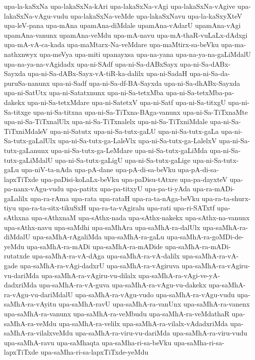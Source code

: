 {upa-la-kaSxNa
upa-lakaSxNa-kAri
upa-lakaSxNa-vAgi
upa-lakaSxNa-vAgive
upa-lakaSxNa-vAgu-vudu
upa-lakaSxNa-veMde
upa-lakaSxNavu
upa-la-kaSxyXteV
upa-leV-pana
upa-mAna
upamAna-diMdale
upamAna-vAdarU
upamAna-vAgi
upamAna-vanunx
upamAna-veMdu
upa-mA-navu
upa-mA-thaR-vuLaLx-dAdxgi
upa-mA-vA-ca-kada
upa-maMtarx-Na-veMdare
upa-maMtirx-sa-beVku
upa-ma-nathxnwyx
upa-meVya
upa-miti
upanayxsa
upa-na-yana
upa-na-ya-na-gaLiMdalU
upa-na-ya-na-vAgidadx
upa-ni-SAdf
upa-ni-Sa-dABxSayx
upa-ni-Sa-dABx-Sayxda
upa-ni-Sa-dABx-Sayx-vA-tiR-ka-dalilx
upa-ni-SadaH
upa-ni-Sa-da-puruSa-nanunx
upa-ni-Sadf
upa-ni-Sa-df-BA-Sayxda
upa-ni-Sa-dhABx-Sayxda
upa-ni-SatUtx
upa-ni-Satatxnunx
upa-ni-Sa-tetxMba
upa-ni-Sa-tetxMba-pa-dakekx
upa-ni-Sa-tetxMdare
upa-ni-SatetxV
upa-ni-Satf
upa-ni-Sa-titxgU
upa-ni-Sa-titxge
upa-ni-Sa-titxna
upa-ni-Sa-TiTxna-BAga-vanunx
upa-ni-Sa-TiTxnaMte
upa-ni-Sa-TiTxnalUlx
upa-ni-Sa-TiTxnalelx
upa-ni-Sa-TiTxniMdale
upa-ni-Sa-TiTxniMdaleV
upa-ni-Satutx
upa-ni-Sa-tutx-gaLU
upa-ni-Sa-tutx-gaLa
upa-ni-Sa-tutx-gaLalUlx
upa-ni-Sa-tutx-ga-LaleVlx
upa-ni-Sa-tutx-ga-LalelxV
upa-ni-Sa-tutx-gaLanunx
upa-ni-Sa-tutx-ga-LeMdare
upa-ni-Sa-tutx-gaLiMda
upa-ni-Sa-tutx-gaLiMdalU
upa-ni-Sa-tutx-gaLigU
upa-ni-Sa-tutx-gaLige
upa-ni-Sa-tutx-gaLu
upa-niV-ta-nAda
upa-pA-dane
upa-pA-di-sa-beVku
upa-pA-di-sa-lapxTiTxde
upa-paDisi-koLaLx-beVku
upa-paDisu-tAtxre
upa-pa-dayxteV
upa-pa-nanx-vAgu-vudu
upa-patitx
upa-pa-titxyU
upa-pa-ti-yAda
upa-ra-mADi-gaLalilx
upa-ra-rAma
upa-rata
upa-rataH
upa-ra-ta-nAga-beVku
upa-ra-ta-shurx-tiyu
upa-ra-ta-sitx-tikuSxH
upa-ra-ta-vAgiralu
upa-rati
upa-ri-SATxtf
upa-sAthxna
upa-sAthxnaM
upa-sAthx-nada
upa-sAthx-nakekx
upa-sAthx-na-vanunx
upa-sAthx-navu
upa-saMdhi
upa-saMhAra
upa-saMhA-ra-dalUlx
upa-saMhA-ra-diMdalU
upa-saMhA-rAgaliMda
upa-saMhA-ra-gaLu
upa-saMhA-ra-goMDi-de-yeMdu
upa-saMhA-ra-mADi
upa-saMhA-ra-mADide
upa-saMhA-ra-mADi-rutatxde
upa-saMhA-ra-vA-dAga
upa-saMhA-ra-vA-dalilx
upa-saMhA-ra-vA-gade
upa-saMhA-ra-vAgi-dadxrU
upa-saMhA-ra-vAgiruva
upa-saMhA-ra-vAgiru-vu-dariMda
upa-saMhA-ra-vAgiru-vu-dilalx
upa-saMhA-ra-vAgi-ve-yA-dadxriMda
upa-saMhA-ra-vA-guva
upa-saMhA-ra-vAgu-vu-dakekx
upa-saMhA-ra-vAgu-vu-dariMdalU
upa-saMhA-ra-vAgu-vudo
upa-saMhA-ra-vAgu-vudu
upa-saMhA-ra-vAyitu
upa-saMhA-ravU
upa-saMhA-ra-vanUnx
upa-saMhA-ra-vanenx
upa-saMhA-ra-vanunx
upa-saMhA-ra-veMbudu
upa-saMhA-ra-veMdathaR
upa-saMhA-ra-veMdu
upa-saMhA-ra-velilx
upa-saMhA-ra-vilalx-vAdadxriMda
upa-saMhA-ra-vilalxveMdu
upa-saMhA-ra-viru-vu-dariMda
upa-saMhA-ra-viru-vudu
upa-saMhA-ravu
upa-saMhaqta
upa-saMha-ri-sa-beVku
upa-saMha-ri-sa-lapxTiTxde
upa-saMha-ri-sa-lapxTiTxde-yeMdu
}
